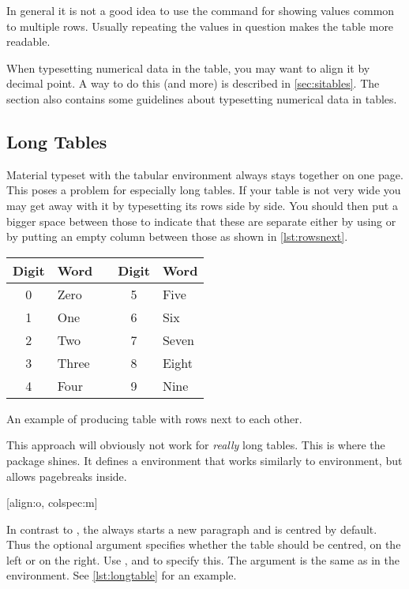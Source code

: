 In general it is not a good idea to use the  command for showing
values common to multiple rows. Usually repeating the values in question makes
the table more readable.

When typesetting numerical data in the table, you may want to align it by
decimal point. A way to do this (and more) is described in
\autoref{sec:sitables}. The section also contains some guidelines about
typesetting numerical data in tables.

\subsection{Long Tables}

Material typeset with the tabular environment always stays together on one
page. This poses a problem for especially long tables. If your table is not
very wide you may get away with it by typesetting its rows side by side. You
should then put a bigger space between those to indicate that these are
separate either by using  or by putting an empty column between
those as shown in \autoref{lst:rowsnext}.
\begin{listing}
  \begin{example}[vertical_mode, examplewidth=0.6\linewidth]
\begin{tabular}{@{}cllcl@{}}
  \toprule
  Digit & Word  && Digit & Word  \\
  \midrule
  0     & Zero  && 5     & Five  \\
  1     & One   && 6     & Six   \\
  2     & Two   && 7     & Seven \\
  3     & Three && 8     & Eight \\
  4     & Four  && 9     & Nine  \\
  \bottomrule
\end{tabular}
\end{example}
  \caption{An example of producing table with rows next to each other.}\label{lst:rowsnext}
\end{listing}

This approach will obviously not work for \emph{really} long tables. This is
where the  package shines. It defines a 
environment that works similarly to  environment, but allows
pagebreaks inside.

\begin{lscommand}
  [align:o, colspec:m]
\end{lscommand}
In contrast to , the  always starts a new paragraph
and is centred by default. Thus the optional argument  specifies
whether the table should be centred, on the left or on the right. Use
,  and  to specify this. The  argument
is the same as in the  environment. See \autoref{lst:longtable}
for an example.

